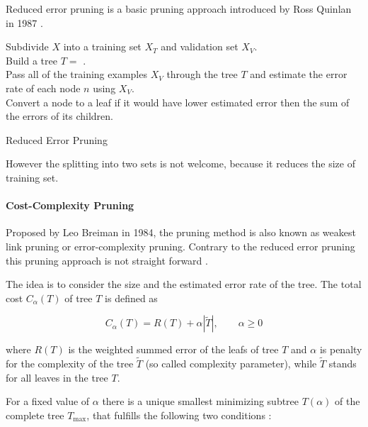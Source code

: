 Reduced error pruning is a basic pruning approach introduced by Ross Quinlan in 1987 \cite{quinlan1987simplifying}. 

\begin{algorithm}[!h]
\BlankLine
Subdivide $X$ into a training set $X_T$ and validation set $X_V$.\\
Build a tree $T = $ .\\
Pass all of the training examples $X_V$ through the tree $T$ and estimate the error rate of each node $n$ using $X_V$.\\
Convert a node to a leaf if it would have lower estimated error then the sum of the errors of its children.\\
\caption{Reduced Error Pruning}
\end{algorithm}

However the splitting into two sets is not welcome, because it reduces the size of training set. 


\paragraph{Cost-Complexity Pruning}

Proposed by Leo Breiman in 1984, the pruning method is also known as weakest link pruning or error-complexity pruning. Contrary to the reduced error pruning this pruning approach is not straight forward \cite[p. 64]{rokach2008data}. 

The idea is to consider the size and the estimated error rate of the tree. The total cost $C_\alpha (T)$ of tree $T$ is defined as

\begin{equation}
    C_\alpha (T) = R(T) + \alpha | \tilde T |, \qquad \alpha \geq 0 
\end{equation}

where $R(T)$ is the weighted summed error of the leafs of tree $T$ and $\alpha$ is penalty for the complexity of the tree $\tilde T$ (so called complexity parameter), while $\tilde T$ stands for all leaves in the tree $T$.

For a fixed value of $\alpha$ there is a unique smallest minimizing subtree $T(\alpha)$ of the complete tree $T_{\max}$, that fulfills the following two conditions \cite{mingers1989empirical}:

